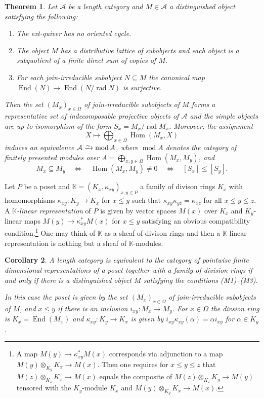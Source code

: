 \documentclass[a4paper]{amsart}
\theoremstyle{plain}
\newtheorem{thm}{Theorem}[section]
\newtheorem{cor}[thm]{Corollary}
\theoremstyle{definition}
\theoremstyle{remark}
\numberwithin{equation}{section}
\newcommand{\End}{\operatorname{End}}
\newcommand{\Hom}{\operatorname{Hom}}
\renewcommand{\mod}{\operatorname{mod}}
\newcommand{\rad}{\operatorname{rad}}
\newcommand{\iso}{\xrightarrow{\raisebox{-.4ex}[0ex][0ex]{$\scriptstyle{\sim}$}}}
\def\A{\mathcal A}
\def\bbK{\mathbb K}
\def\a{\alpha}
\def\Om{\Omega}
\begin{document}
\begin{thm}\label{th:birkhoff}
  Let $\A$ be a length category and $M\in\A$ a distinguished object satisfying the following:
  \begin{enumerate}
  \item[(M1)] The ext-quiver  has no oriented cycle.
  \item[(M2)] The object $M$ has a distributive lattice of
    subobjects and each object is a subquotient of a finite
    direct sum of copies of $M$.
  \item[(M3)]  For each join-irreducible subobject $N\subseteq M$ the
    canonical map 
    $\End(N)\to\End(N/\rad N)$ is surjective.
\end{enumerate}
Then the set $(M_x)_{x\in\Om}$ of join-irreducible subobjects of $M$
forms a representative set of indecomposable projective objects of
$\A$ and the simple objects are up to isomorphism of the form $S_x=M_x/\rad M_x$.
Moreover, the assignment
\[X\longmapsto \bigoplus_{x\in\Om}\Hom(M_x,X)\] induces an equivalence
$\A\iso\mod A$, where $\mod A$ denotes the category of finitely
presented modules over
$A=\bigoplus_{x,y\in\Om}\Hom(M_x,M_y)$, and
\[M_x\subseteq M_y\quad\iff\quad\Hom(M_x,M_y)\neq 0\quad\iff\quad
  [S_x]\le [S_y].\]
\end{thm}

Let $P$ be a poset and $\bbK=(K_x,\kappa_{xy})_{x,y\in P}$ a family of
divison rings $K_x$ with homomorphisms $\kappa_{xy}\colon K_y\to K_x$
for $x\le y$ such that $\kappa_{xy}\kappa_{yz}=\kappa_{xz}$ for all $x\le y\le
z$. A \emph{$\bbK$-linear representation} of $P$ is given by vector
spaces $M(x)$ over $K_x$ and $K_y$-linear maps
$M(y)\to\kappa_{xy}^*M(x)$ for $x\le y$ satisfying an obvious
compatibility condition.\footnote{A map $M(y)\to\kappa_{xy}^*M(x)$
  corresponds via adjunction to a map $M(y)\otimes_{K_y}K_x\to M(x)$. Then one requires
  for $x\le y\le z$ that $M(z)\otimes_{K_z}K_x\to M(x)$ equals the
  composite of $M(z)\otimes_{K_z}K_y\to M(y)$ tensored with the
  $K_y$-module $K_x$ and $M(y)\otimes_{K_y}K_x\to M(x)$.} One
may think of $\bbK$ as a sheaf of divison rings and then a
$\bbK$-linear representation is nothing but a sheaf of $\bbK$-modules.

\begin{cor}\label{co:birkhoff}
  A length category is equivalent to the category of pointwise finite
  dimensional representations of a poset together with a family of
  division rings if and only if there is a distinguished object $M$
  satisfying the conditions \emph{(M1)--(M3)}.

  In this case the poset is given by the set $(M_x)_{x\in\Om}$ of
  join-irreducible subobjects of $M$, and $x\le y$ if there is an
  inclusion $i_{xy}\colon M_x\to M_y$. For $x\in\Om$ the divsion ring
  is $K_x=\End(M_x)$ and $\kappa_{xy}\colon K_y\to K_x$ is given by
  $i_{xy}\kappa_{xy}(\a)=\a i_{xy}$ for $\a\in K_y$.
\end{cor}  
\end{document}
